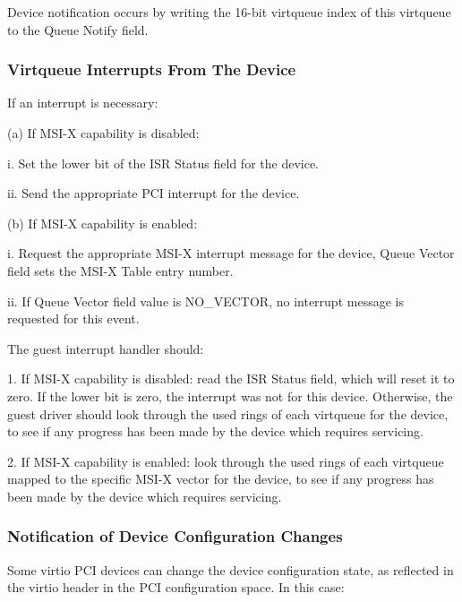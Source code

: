 Device notification occurs by writing the 16-bit virtqueue index
of this virtqueue to the Queue Notify field.

\subsubsection{Virtqueue Interrupts From The Device}\label{sec:Virtio Transport Options / Virtio Over PCI Bus / PCI-specific Initialization And Device Operation / Virtqueue Interrupts From The Device}

If an interrupt is necessary:

  (a) If MSI-X capability is disabled:

    i. Set the lower bit of the ISR Status field for the device.

    ii. Send the appropriate PCI interrupt for the device.

  (b) If MSI-X capability is enabled:

    i. Request the appropriate MSI-X interrupt message for the
      device, Queue Vector field sets the MSI-X Table entry
      number.

    ii. If Queue Vector field value is NO_VECTOR, no interrupt
      message is requested for this event.

The guest interrupt handler should:

1. If MSI-X capability is disabled: read the ISR Status field,
  which will reset it to zero. If the lower bit is zero, the
  interrupt was not for this device. Otherwise, the guest driver
  should look through the used rings of each virtqueue for the
  device, to see if any progress has been made by the device
  which requires servicing.

2. If MSI-X capability is enabled: look through the used rings of
  each virtqueue mapped to the specific MSI-X vector for the
  device, to see if any progress has been made by the device
  which requires servicing.

\subsubsection{Notification of Device Configuration Changes}\label{sec:Virtio Transport Options / Virtio Over PCI Bus / PCI-specific Initialization And Device Operation / Notification of Device Configuration Changes}

Some virtio PCI devices can change the device configuration
state, as reflected in the virtio header in the PCI configuration
space. In this case:

